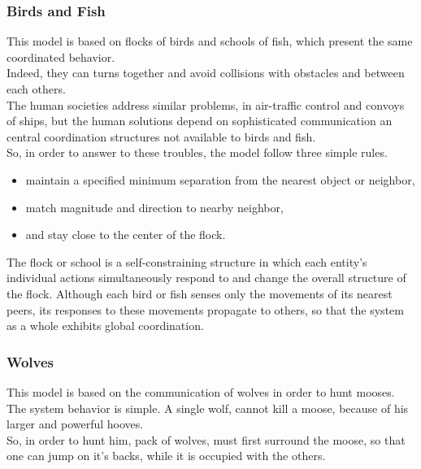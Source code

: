 \newpage

\subsubsection{Birds and Fish}

This model is based on flocks of birds and schools of fish, which present the same coordinated behavior.\\
Indeed, they can turns together and avoid collisions with obstacles and between each others.\\

The human societies address similar problems, in air-traffic control and convoys of ships, but the human solutions depend on sophisticated communication an central coordination structures not available to birds and fish.\\

So, in order to answer to these troubles, the model follow three simple rules.
\begin{itemize}
\item maintain a specified minimum separation from the nearest object or neighbor,
\item match magnitude and direction to nearby neighbor,
\item and stay close to the center of the flock.
\end{itemize}

The flock or school is a self-constraining structure in which each entity’s individual
actions simultaneously respond to and change the overall structure of the flock. Although each bird or
fish senses only the movements of its nearest peers, its responses to these movements propagate to
others, so that the system as a whole exhibits global coordination.\\

\newpage

\subsubsection{Wolves}

This model is based on the communication of wolves in order to hunt mooses.\\
The system behavior is simple. A single wolf, cannot kill a moose, because of his larger and powerful hooves.\\
So, in order to hunt him, pack of wolves, must first surround the moose, so that one can jump on it's backs, while it is occupied with the others.\\

